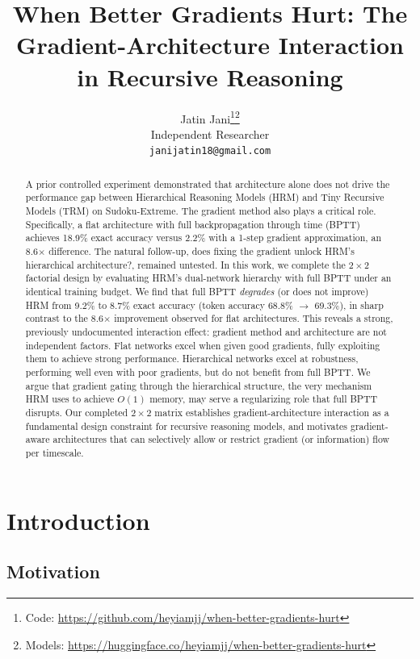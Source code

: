 \documentclass{article}
\title{When Better Gradients Hurt: The Gradient-Architecture Interaction in Recursive Reasoning}
\author{
  Jatin Jani\thanks{Code: \url{https://github.com/heyiamjj/when-better-gradients-hurt}}\thanks{Models: \url{https://huggingface.co/heyiamjj/when-better-gradients-hurt}} \\
  Independent Researcher \\
  \texttt{janijatin18@gmail.com}
}
\begin{document}
\maketitle

\begin{abstract}
A prior controlled experiment demonstrated that architecture alone does not drive the performance gap between Hierarchical Reasoning Models (HRM) and Tiny Recursive Models (TRM) on Sudoku-Extreme. The gradient method also plays a critical role. Specifically, a flat architecture with full backpropagation through time (BPTT) achieves 18.9\% exact accuracy versus 2.2\% with a 1-step gradient approximation, an 8.6$\times$ difference. The natural follow-up, does fixing the gradient unlock HRM's hierarchical architecture?, remained untested. In this work, we complete the $2\times2$ factorial design by evaluating HRM's dual-network hierarchy with full BPTT under an identical training budget. We find that full BPTT \emph{degrades} (or does not improve) HRM from 9.2\% to 8.7\% exact accuracy (token accuracy 68.8\% $\rightarrow$ 69.3\%), in sharp contrast to the 8.6$\times$ improvement observed for flat architectures. This reveals a strong, previously undocumented interaction effect: gradient method and architecture are not independent factors. Flat networks excel when given good gradients, fully exploiting them to achieve strong performance. Hierarchical networks excel at robustness, performing well even with poor gradients, but do not benefit from full BPTT. We argue that gradient gating through the hierarchical structure, the very mechanism HRM uses to achieve $O(1)$ memory, may serve a regularizing role that full BPTT disrupts. Our completed $2\times2$ matrix establishes gradient-architecture interaction as a fundamental design constraint for recursive reasoning models, and motivates gradient-aware architectures that can selectively allow or restrict gradient (or information) flow per timescale.
\end{abstract}


\section{Introduction}

\subsection{Motivation}
\end{document}
